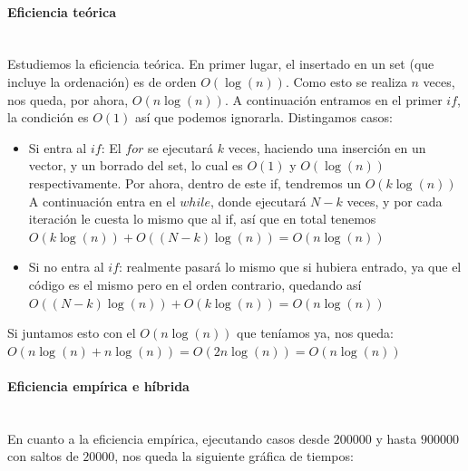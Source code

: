 \documentclass{article}
\newcommand{\myparagraph}[1]{\paragraph{#1}\mbox{}\\}
\begin{document}
\myparagraph{Eficiencia teórica}
    Estudiemos la eficiencia teórica. En primer lugar, el insertado en un set (que incluye la ordenación) es de orden $O(\log (n))$. Como esto se realiza $n$ veces, nos queda, por ahora, $O (n \log (n))$. \newline
    A continuación entramos en el primer $if$, la condición es $O(1)$ así que podemos ignorarla. Distingamos casos: \begin{itemize}
        \item Si entra al $if$: El $for$ se ejecutará $k$ veces, haciendo una inserción en un vector, y un borrado del set, lo cual es $O(1)$ y $O(\log (n))$ respectivamente. Por ahora, dentro de este if, tendremos un $O(k \log (n))$
        A continuación entra en el $while$, donde ejecutará $N-k$ veces, y por cada iteración le cuesta lo mismo que al if, así que en total tenemos $O(k \log (n)) + O((N-k) \log (n)) = O(n \log (n))$
        \item Si no entra al $if$: realmente pasará lo mismo que si hubiera entrado, ya que el código es el mismo pero en el orden contrario, quedando así $O((N-k) \log (n)) + O(k \log (n)) = O(n \log (n))$
    \end{itemize}
    Si juntamos esto con el $O(n \log (n))$ que teníamos ya, nos queda: $O(n \log (n) + n \log (n)) = O (2n \log (n)) = O(n \log (n))$
\myparagraph{Eficiencia empírica e híbrida}
En cuanto a la eficiencia empírica, ejecutando casos desde $200000$ y hasta $900000$ con saltos de $20000$, nos queda la siguiente gráfica de tiempos:
\end{document}
